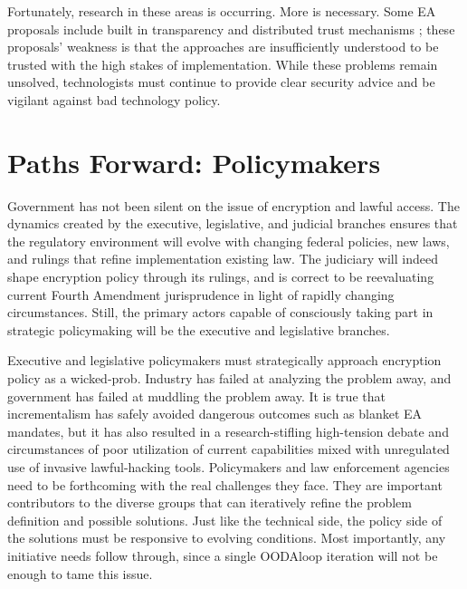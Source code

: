 Fortunately, research in these areas is occurring. More is necessary. Some \ac{EA} proposals include built in
transparency and distributed trust mechanisms \cite{goos_oblivious_1996} \cite{phan_key_2017}
\cite{servan_schreiber_jje_2020}; these proposals' weakness is that the approaches are insufficiently understood to be
trusted with the high stakes of implementation. While these problems remain unsolved, technologists must continue to
provide clear security advice and be vigilant against bad technology policy.


\section{Paths Forward: Policymakers}


Government has not been silent on the issue of encryption and lawful access. The dynamics created by the executive,
legislative, and judicial branches ensures that the regulatory environment will evolve with changing federal policies,
new laws, and rulings that refine implementation existing law. The judiciary will indeed shape encryption policy through
its rulings, and is correct to be reevaluating current Fourth Amendment jurisprudence in light of rapidly changing
circumstances. Still, the primary actors capable of consciously taking part in strategic policymaking will be the
executive and legislative branches.

Executive and legislative policymakers must strategically approach encryption policy as a \ac{wicked-prob}. Industry has
failed at analyzing the problem away, and government has failed at muddling the problem away. It is true that
incrementalism has safely avoided dangerous outcomes such as blanket \ac{EA} mandates, but it has also resulted in a
research-stifling high-tension debate and circumstances of poor utilization of current capabilities mixed with
unregulated use of invasive \ac{lawful-hacking} tools. Policymakers and law enforcement agencies need to be forthcoming
with the real challenges they face. They are important contributors to the diverse groups that can iteratively refine
the problem definition and possible solutions. Just like the technical side, the policy side of the solutions must be
responsive to evolving conditions. Most importantly, any initiative needs follow through, since a single \ac{OODAloop}
iteration will not be enough to tame this issue.

